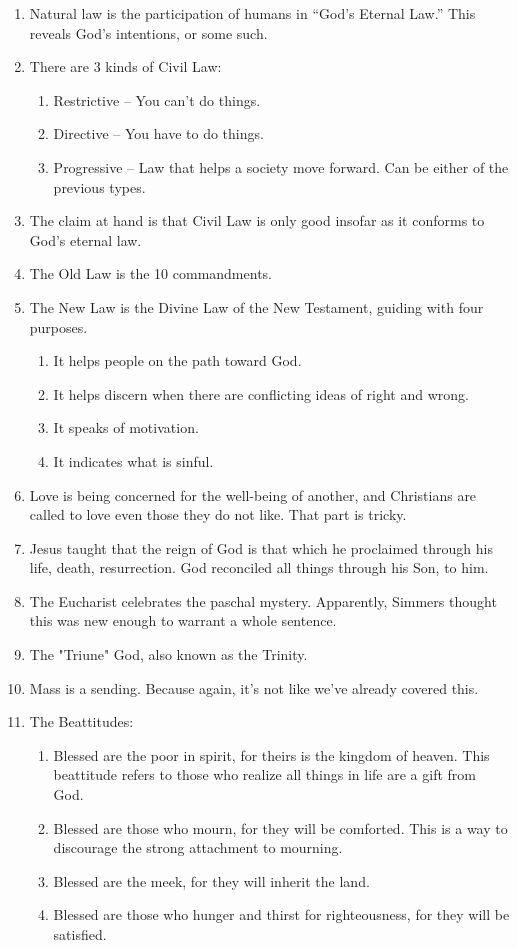 \documentclass[10pt]{article}
\begin{document}
\begin{enumerate}
	\item Natural law is the participation of humans in ``God's Eternal Law.''  
		This reveals God's intentions, or some such.
	\item There are 3 kinds of Civil Law:
		\begin{enumerate}
			\item Restrictive -- You can't do things.
			\item Directive -- You have to do things.
			\item Progressive -- Law that helps a society move forward.  Can be
				either of the previous types.
		\end{enumerate}
	\item The claim at hand is that Civil Law is only good insofar as it conforms
		to God's eternal law.
	\item The Old Law is the 10 commandments.
	\item The New Law is the Divine Law of the New Testament, guiding with four
		purposes.
		\begin{enumerate}
			\item It helps people on the path toward God.
			\item It helps discern when there are conflicting ideas of right and
				wrong.
			\item It speaks of motivation.
			\item It indicates what is sinful.
		\end{enumerate}
	\item Love is being concerned for the well-being of another, and Christians
		are called to love even those they do not like.  That part is tricky.
	\item Jesus taught that the reign of God is that which he proclaimed through
		his life, death, resurrection.  God reconciled all things through his Son,
		to him.
	\item The Eucharist celebrates the paschal mystery.  Apparently, Simmers 
		thought	this was new enough to warrant a whole sentence.
	\item The "Triune" God, also known as the Trinity.
	\item Mass is a sending.  Because again, it's not like we've already covered
		this.
	\item The Beattitudes:
		\begin{enumerate}
			\item Blessed are the poor in spirit, for theirs is the kingdom of heaven.
				This beattitude refers to those who realize all things in life are a
				gift from God.
			\item Blessed are those who mourn, for they will be comforted.  This is
				a way to discourage the strong attachment to mourning.
			\item Blessed are the meek, for they will inherit the land.
			\item Blessed are those who hunger and thirst for righteousness, for
				they will be satisfied.
		\end{enumerate}
\end{enumerate}
\end{document}
